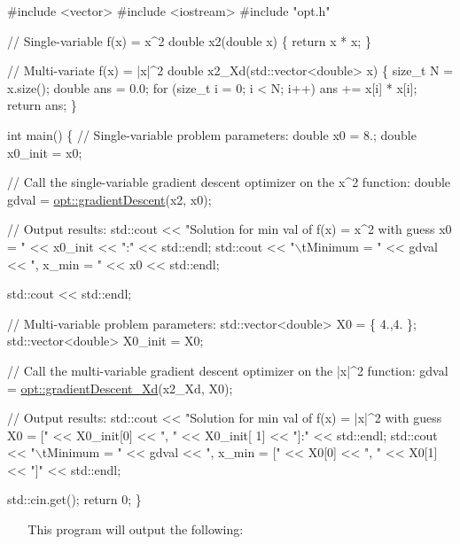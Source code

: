 \begin{DoxyCodeInclude}
\textcolor{preprocessor}{#include <vector>}
\textcolor{preprocessor}{#include <iostream>}
\textcolor{preprocessor}{#include "opt.h"}

\textcolor{comment}{// Single-variable f(x) = x^2}
\textcolor{keywordtype}{double} x2(\textcolor{keywordtype}{double} x)
\{
    \textcolor{keywordflow}{return} x * x;
\}

\textcolor{comment}{// Multi-variate f(x) = |x|^2}
\textcolor{keywordtype}{double} x2\_Xd(std::vector<double> x)
\{
    \textcolor{keywordtype}{size\_t} N = x.size();
    \textcolor{keywordtype}{double} ans = 0.0;
    \textcolor{keywordflow}{for} (\textcolor{keywordtype}{size\_t} i = 0; i < N; i++)
        ans += x[i] * x[i];
    \textcolor{keywordflow}{return} ans;
\}

\textcolor{keywordtype}{int} main()
\{
    \textcolor{comment}{// Single-variable problem parameters:}
    \textcolor{keywordtype}{double} x0 = 8.;
    \textcolor{keywordtype}{double} x0\_init = x0;

    \textcolor{comment}{// Call the single-variable gradient descent optimizer on the x^2 function:}
    \textcolor{keywordtype}{double} gdval = \mbox{\hyperlink{namespaceopt_af1ef2e32062af31429ae74fc07c57fb0}{opt::gradientDescent}}(x2, x0);

    \textcolor{comment}{// Output results:}
    std::cout << \textcolor{stringliteral}{"Solution for min val of f(x) = x^2 with guess x0 = "} << x0\_init << \textcolor{stringliteral}{":"} << std::endl;
    std::cout <<  \textcolor{stringliteral}{"\(\backslash\)tMinimum = "} << gdval << \textcolor{stringliteral}{", x\_min = "} << x0 << std::endl;

    std::cout << std::endl;

    \textcolor{comment}{// Multi-variable problem parameters:}
    std::vector<double> X0 = \{ 4.,4. \};
    std::vector<double> X0\_init = X0;

    \textcolor{comment}{// Call the multi-variable gradient descent optimizer on the |x|^2 function:}
    gdval = \mbox{\hyperlink{namespaceopt_a7db27c86e1c5a503b7f8373ba067d97b}{opt::gradientDescent\_Xd}}(x2\_Xd, X0);

    \textcolor{comment}{// Output results:}
    std::cout << \textcolor{stringliteral}{"Solution for min val of f(x) = |x|^2 with guess X0 = ["} << X0\_init[0] << \textcolor{stringliteral}{", "} << X0\_init[
      1] << \textcolor{stringliteral}{"]:"} << std::endl;
    std::cout << \textcolor{stringliteral}{"\(\backslash\)tMinimum = "} << gdval << \textcolor{stringliteral}{", x\_min = ["} << X0[0] << \textcolor{stringliteral}{", "} << X0[1] << \textcolor{stringliteral}{"]"} << std::endl;

    std::cin.get();
    \textcolor{keywordflow}{return} 0;
\}
\end{DoxyCodeInclude}
 ~\newline
~\newline
 This program will output the following\+: ~\newline
 
